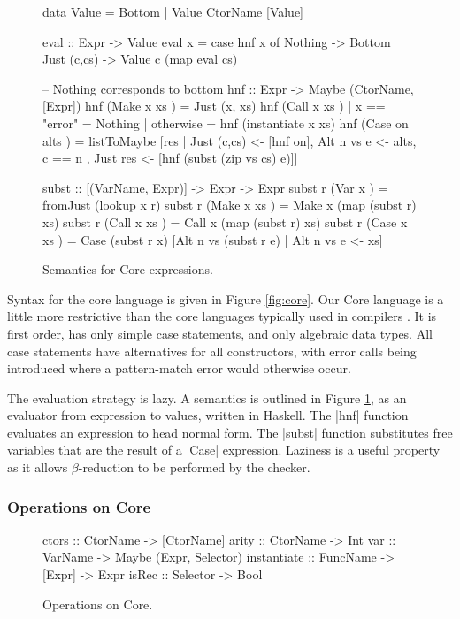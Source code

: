 \documentclass[preprint]{sigplanconf}
\newcommand{\C}[1]{\textsf{#1}}
\begin{document}
\begin{figure}
\begin{code}
data Value = Bottom | Value CtorName [Value]

eval :: Expr -> Value
eval x = case  hnf x of
               Nothing      -> Bottom
               Just (c,cs)  -> Value c (map eval cs)

-- Nothing corresponds to bottom
hnf :: Expr -> Maybe (CtorName, [Expr])
hnf (Make  x   xs    )  =  Just (x, xs)
hnf (Call  x   xs    )  |  x == "error"  = Nothing
                        |  otherwise     = hnf (instantiate x xs)
hnf (Case  on  alts  )  =  listToMaybe [res
       | Just (c,cs) <- [hnf on], Alt n vs e <- alts, c == n
       , Just res <- [hnf (subst (zip vs cs) e)]]

subst :: [(VarName, Expr)] -> Expr -> Expr
subst r (Var   x     ) = fromJust (lookup x r)
subst r (Make  x xs  ) = Make  x (map (subst r) xs)
subst r (Call  x xs  ) = Call  x (map (subst r) xs)
subst r (Case  x xs  ) = Case (subst r x)
    [Alt n vs (subst r e) | Alt n vs e <- xs]
\end{code}
\caption{Semantics for Core expressions.}
\label{fig:semantics}
\end{figure}

Syntax for the core language is given in Figure \ref{fig:core}. Our Core language is a little more restrictive than the core languages typically used in compilers \citep{ghc_core}. It is first order, has only simple case statements, and only algebraic data types. All case statements have alternatives for all constructors, with \C{error} calls being introduced where a pattern-match error would otherwise occur.

The evaluation strategy is lazy. A semantics is outlined in Figure \ref{fig:semantics}, as an evaluator from expression to values, written in Haskell. The |hnf| function evaluates an expression to head normal form. The |subst| function substitutes free variables that are the result of a |Case| expression. Laziness is a useful property as it allows $\beta$-reduction to be performed by the checker.

\subsubsection{Operations on Core}

\begin{figure}
\begin{code}
ctors        :: CtorName  -> [CtorName]
arity        :: CtorName  -> Int
var          :: VarName   -> Maybe (Expr, Selector)
instantiate  :: FuncName  -> [Expr] -> Expr
isRec        :: Selector  -> Bool
\end{code}
\caption{Operations on Core.}
\label{fig:core_operations}
\end{figure}
\end{document}
